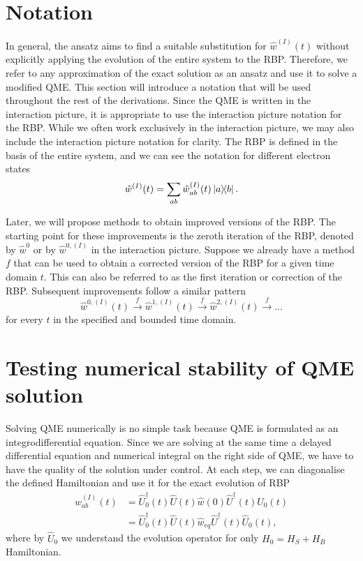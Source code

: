 \section{Notation}
In general, the ansatz aims to find a suitable substitution for $\hat{w}^{(I)}(t)$ without explicitly applying the evolution of the entire system to the RBP. Therefore, we refer to any approximation of the exact solution as an ansatz and use it to solve a modified QME. This section will introduce a notation that will be used throughout the rest of the derivations. Since the QME is written in the interaction picture, it is appropriate to use the interaction picture notation for the RBP. While we often work exclusively in the interaction picture, we may also include the interaction picture notation for clarity. The RBP is defined in the basis of the entire system, and we can see the notation for different electron states
\begin{equation}
    \hat{w}^{(I)}(t)  = \sum_{ab} \hat{w}^{(I)}_{ab}(t) \ketbra{a}{b}.
\end{equation}

Later, we will propose methods to obtain improved versions of the RBP. The starting point for these improvements is the zeroth iteration of the RBP, denoted by $\hat{w}^{0}$ or by $\hat{w}^{0,(I)}$ in the interaction picture. Suppose we already have a method $f$ that can be used to obtain a corrected version of the RBP for a given time domain $t$. This can also be referred to as the first iteration or correction of the RBP. Subsequent improvements follow a similar pattern
\begin{equation}
    \hat{w}^{0,(I)}(t) \overset{f}{\longrightarrow} \hat{w}^{1,(I)}(t)  \overset{f}{\longrightarrow} \hat{w}^{2,(I)}(t)  \overset{f}{\longrightarrow} \ldots 
\end{equation}
for every $t$ in the specified and bounded time domain.

\section{Testing numerical stability of QME solution}
\label{Testing numerical stability of QME solution}
Solving QME numerically is no simple task because QME is formulated as an integrodifferential equation. Since we are solving at the same time a delayed differential equation and numerical integral on the right side of QME, we have to have the quality of the solution under control. At each step, we can diagonalise the defined Hamiltonian and use it for the exact evolution of RBP 
\begin{equation}
\begin{aligned}
    \hat{w}^{(I)}_{ab}(t) &= \hat{U}_0^\dagger(t) \hat{U}(t) \hat{w}(0) \hat{U}^\dagger(t)\hat{U}_0(t) \\
    &= \hat{U}_0^\dagger(t) \hat{U}(t) \hat{w}_{eq} \hat{U}^\dagger(t) \hat{U}_0(t),
\end{aligned}
\end{equation}
where by $\hat{U}_0$ we understand the evolution operator for only $H_0 = H_S + H_B$ Hamiltonian.

